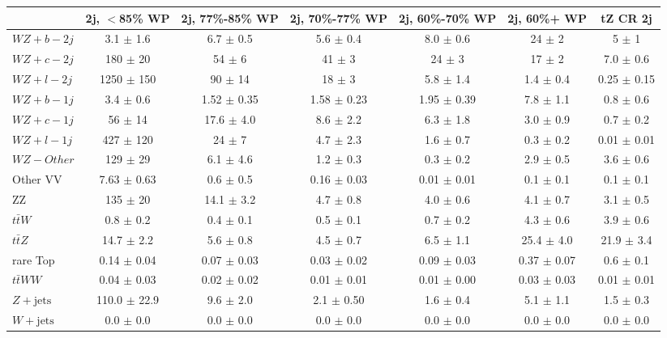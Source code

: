 \begin{tabular}{|l|c|c|c|c|c|c|}
\hline 
 & {2j, $<$85\% WP} & {2j, 77\%-85\% WP} & {2j, 70\%-77\% WP} & {2j, 60\%-70\% WP} & {2j, 60\%+ WP} & {tZ CR 2j}\\
\hline 
  $WZ + b - 2j$   & 3.1 $\pm$ 1.6 & 6.7 $\pm$ 0.5 & 5.6 $\pm$ 0.4 & 8.0 $\pm$ 0.6 & 24 $\pm$ 2 & 5 $\pm$ 1 \\ 
  $WZ + c - 2j$   & 180 $\pm$ 20 & 54 $\pm$ 6 & 41 $\pm$ 3 & 24 $\pm$ 3 & 17 $\pm$ 2 & 7.0 $\pm$ 0.6 \\ 
  $WZ + l - 2j$   & 1250 $\pm$ 150 & 90 $\pm$ 14 & 18 $\pm$ 3 & 5.8 $\pm$ 1.4 & 1.4 $\pm$ 0.4 & 0.25 $\pm$ 0.15 \\ 
  $WZ + b - 1j$   & 3.4 $\pm$ 0.6 & 1.52 $\pm$ 0.35 & 1.58 $\pm$ 0.23 & 1.95 $\pm$ 0.39 & 7.8 $\pm$ 1.1 & 0.8 $\pm$ 0.6 \\ 
  $WZ + c - 1j$   & 56 $\pm$ 14 & 17.6 $\pm$ 4.0 & 8.6 $\pm$ 2.2 & 6.3 $\pm$ 1.8 & 3.0 $\pm$ 0.9 & 0.7 $\pm$ 0.2 \\
  $WZ + l - 1j$   & 427 $\pm$ 120 & 24 $\pm$ 7 & 4.7 $\pm$ 2.3 & 1.6 $\pm$ 0.7 & 0.3 $\pm$ 0.2 & 0.01 $\pm$ 0.01 \\
  $WZ - Other$   & 129 $\pm$ 29 & 6.1 $\pm$ 4.6 & 1.2 $\pm$ 0.3 & 0.3 $\pm$ 0.2 & 2.9 $\pm$ 0.5 & 3.6 $\pm$ 0.6 \\
  Other VV   & 7.63 $\pm$ 0.63 & 0.6 $\pm$ 0.5 & 0.16 $\pm$ 0.03 & 0.01 $\pm$ 0.01 & 0.1 $\pm$ 0.1 & 0.1 $\pm$ 0.1 \\ 
  ZZ   & 135 $\pm$ 20 & 14.1 $\pm$ 3.2 & 4.7 $\pm$ 0.8 & 4.0 $\pm$ 0.6 & 4.1 $\pm$ 0.7 & 3.1 $\pm$ 0.5 \\ 
  $t\bar{t}W$   & 0.8 $\pm$ 0.2 & 0.4 $\pm$ 0.1 & 0.5 $\pm$ 0.1 & 0.7 $\pm$ 0.2 & 4.3 $\pm$ 0.6 & 3.9 $\pm$ 0.6 \\ 
  $t\bar{t}Z$   & 14.7 $\pm$ 2.2 & 5.6 $\pm$ 0.8 & 4.5 $\pm$ 0.7 & 6.5 $\pm$ 1.1 & 25.4 $\pm$ 4.0 & 21.9 $\pm$ 3.4 \\ 
  rare Top   & 0.14 $\pm$ 0.04 & 0.07 $\pm$ 0.03 & 0.03 $\pm$ 0.02 & 0.09 $\pm$ 0.03 & 0.37 $\pm$ 0.07 & 0.6 $\pm$ 0.1 \\ 
  $t\bar{t}WW$   & 0.04 $\pm$ 0.03 & 0.02 $\pm$ 0.02 & 0.01 $\pm$ 0.01 & 0.01 $\pm$ 0.00 & 0.03 $\pm$ 0.03 & 0.01 $\pm$ 0.01 \\ 
  $Z+\text{jets}$   & 110.0 $\pm$ 22.9 & 9.6 $\pm$ 2.0 & 2.1 $\pm$ 0.50 & 1.6 $\pm$ 0.4 & 5.1 $\pm$ 1.1 & 1.5 $\pm$ 0.3 \\ 
  $W+\text{jets}$   & 0.0 $\pm$ 0.0 & 0.0 $\pm$ 0.0 & 0.0 $\pm$ 0.0 & 0.0 $\pm$ 0.0 & 0.0 $\pm$ 0.0 & 0.0 $\pm$ 0.0 \\ 

\end{tabular}
